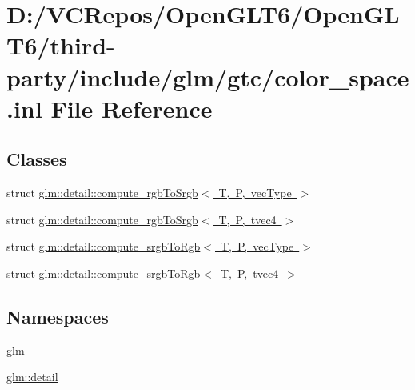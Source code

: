 \hypertarget{gtc_2color__space_8inl}{}\section{D\+:/\+V\+C\+Repos/\+Open\+G\+L\+T6/\+Open\+G\+L\+T6/third-\/party/include/glm/gtc/color\+\_\+space.inl File Reference}
\label{gtc_2color__space_8inl}
\subsection*{Classes}
\begin{DoxyCompactItemize}
\item 
struct \mbox{\hyperlink{structglm_1_1detail_1_1compute__rgb_to_srgb}{glm\+::detail\+::compute\+\_\+rgb\+To\+Srgb$<$ T, P, vec\+Type $>$}}
\item 
struct \mbox{\hyperlink{structglm_1_1detail_1_1compute__rgb_to_srgb_3_01_t_00_01_p_00_01tvec4_01_4}{glm\+::detail\+::compute\+\_\+rgb\+To\+Srgb$<$ T, P, tvec4 $>$}}
\item 
struct \mbox{\hyperlink{structglm_1_1detail_1_1compute__srgb_to_rgb}{glm\+::detail\+::compute\+\_\+srgb\+To\+Rgb$<$ T, P, vec\+Type $>$}}
\item 
struct \mbox{\hyperlink{structglm_1_1detail_1_1compute__srgb_to_rgb_3_01_t_00_01_p_00_01tvec4_01_4}{glm\+::detail\+::compute\+\_\+srgb\+To\+Rgb$<$ T, P, tvec4 $>$}}
\end{DoxyCompactItemize}
\subsection*{Namespaces}
\begin{DoxyCompactItemize}
\item 
 \mbox{\hyperlink{namespaceglm}{glm}}
\item 
 \mbox{\hyperlink{namespaceglm_1_1detail}{glm\+::detail}}
\end{DoxyCompactItemize}
